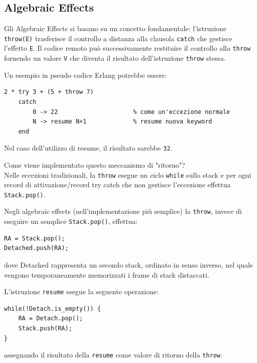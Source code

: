 \documentclass{article}
\begin{document}
\subsection*{Algebraic Effects}
Gli Algebraic Effects si basano su un concetto fondamentale: l'istruzione \texttt{throw(E)} trasferisce il controllo a distanza alla clausola \texttt{catch} che gestisce l'effetto \texttt{E}. Il codice remoto può successivamente restituire il controllo alla \texttt{throw} fornendo un valore \texttt{V} che diventa il risultato dell'istruzione \texttt{throw} stessa.

Un esempio in pseudo codice Erlang potrebbe essere:
\begin{tcolorbox}
\begin{verbatim}
2 * try 3 + (5 + throw 7)
    catch
        0 -> 22                     % come un'eccezione normale
        N -> resume N+1             % resume nuova keyword
    end
\end{verbatim}
\end{tcolorbox}
Nel caso dell'utilizzo di resume, il risultato sarebbe \texttt{32}.

Come viene implementato questo meccanismo di "ritorno"?\\
Nelle eccezioni tradizionali, la \texttt{throw} esegue un ciclo \texttt{while} sullo stack e per ogni record di attivazione/record try catch che non gestisce l'eccezione effettua \texttt{Stack.pop()}.

Negli algebraic effects (nell'implementazione più semplice) la \texttt{throw}, invece di eseguire un semplice \texttt{Stack.pop()}, effettua:
\begin{tcolorbox}
\begin{verbatim}
RA = Stack.pop();
Detached.push(RA);
\end{verbatim}
\end{tcolorbox}
dove Detached rappresenta un secondo stack, ordinato in senso inverso, nel quale vengono temporaneamente memorizzati i frame di stack distaccati.

L'istruzione \texttt{resume} esegue la seguente operazione:
\begin{tcolorbox}
\begin{verbatim}
while(!Detach.is_empty()) {
    RA = Detach.pop();
    Stack.push(RA);
}
\end{verbatim}
\end{tcolorbox}
assegnando il risultato della \texttt{resume} come valore di ritorno della \texttt{throw}.
\end{document}
